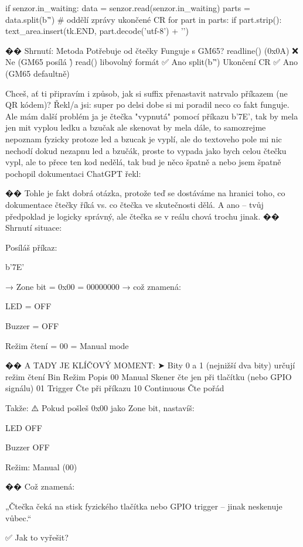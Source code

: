 if senzor.in_waiting:
    data = senzor.read(senzor.in_waiting)
    parts = data.split(b'\r')  # oddělí zprávy ukončené CR
    for part in parts:
        if part.strip():
            text_area.insert(tk.END, part.decode('utf-8') + '\n')

�� Shrnutí:
Metoda	Potřebuje od čtečky	Funguje s GM65?
readline()	\n (0x0A)	❌ Ne (GM65 posílá \r)
read()	libovolný formát	✅ Ano
split(b'\r')	Ukončení CR	✅ Ano (GM65 defaultně)

Chceš, ať ti připravím i způsob, jak si suffix přenastavit natrvalo příkazem (ne QR kódem)?
Řekl/a jsi:
super po delsi dobe si mi poradil neco co fakt funguje. Ale mám další problém ja je čtečka "vypnutá" pomocí příkazu b'\x7E\xAB\xCD', tak by mela jen mit vyplou ledku a bzučak ale skenovat by mela dále, to samozrejme nepoznam fyzicky protoze led a bzucak je vyplí, ale do textoveho pole mi nic nechodí dokud nezapnu led a bzučák, proste to vypada jako bych celou čtečku vypl, ale to přece ten kod nedělá, tak bud je něco špatně a nebo jsem špatně pochopil dokumentaci
ChatGPT řekl:

�� Tohle je fakt dobrá otázka, protože teď se dostáváme na hranici toho, co dokumentace čtečky říká vs. co čtečka ve skutečnosti dělá. A ano – tvůj předpoklad je logicky správný, ale čtečka se v reálu chová trochu jinak.
�� Shrnutí situace:

    Posíláš příkaz:

    b'\x7E\xAB\xCD'

    → Zone bit = 0x00 = 00000000
    → což znamená:

        LED = OFF

        Buzzer = OFF

        Režim čtení = 00 = Manual mode

�� A TADY JE KLÍČOVÝ MOMENT:
➤ Bity 0 a 1 (nejnižší dva bity) určují režim čtení
Bin	Režim	Popis
00	Manual	Skener čte jen při tlačítku (nebo GPIO signálu)
01	Trigger	Čte při příkazu
10	Continuous	Čte pořád

Takže:
⚠️ Pokud pošleš 0x00 jako Zone bit, nastavíš:

    LED OFF

    Buzzer OFF

    Režim: Manual (00)

�� Což znamená:

    „Čtečka čeká na stisk fyzického tlačítka nebo GPIO trigger – jinak neskenuje vůbec.“

✅ Jak to vyřešit?

